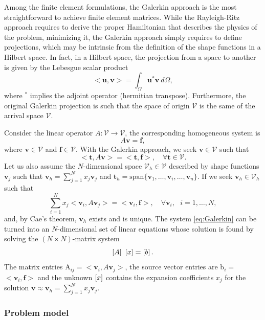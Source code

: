 Among the finite element formulations, the Galerkin approach is the most straightforward to achieve finite element matrices. While the Rayleigh-Ritz approach requires to derive the proper Hamiltonian that describes the physics of the problem,  minimizing it, the Galerkin approach simply requires to define projections, which may be intrinsic from the definition of the shape functions in a Hilbert space. In fact, in a Hilbert space, the projection from a space to another is given by the Lebesgue scalar product 
%
$$<\mathbf{u},\mathbf{v}> = \int_\Omega \mathbf{u}^* \mathbf{v} \ d\Omega,$$
%
\noindent where $^*$ implies the adjoint operator (hermitian transpose). Furthermore, the original Galerkin projection is such that the space of origin $\mathcal{V}$ is the same of the arrival space $\mathcal{V}$. 

Consider the linear operator $A : \mathcal{V} \longrightarrow \mathcal{V}$, the corresponding homogeneous system is
$$A \mathbf{v} = \mathbf{f},$$
\noindent where $\mathbf{v} \in \mathcal{V}$ and $\mathbf{f} \in \mathcal{V}$. With the Galerkin approach, we seek $\mathbf{v} \in \mathcal{V}$ such that
$$< \mathbf{t}, A \mathbf{v}> = <\mathbf{t},\mathbf{f}>, \quad \forall \mathbf{t} \in \mathcal{V}.$$
\noindent Let us also assume the $N$-dimensional space $\mathcal{V}_h\in \mathcal{V}$ described by shape functions $\mathbf{v}_j$ such that $\mathbf{v}_h = \sum_{j=1}^N x_j \mathbf{v}_j$ and $\mathbf{t}_h = \mathrm{span}\lbrace{\mathbf{v}_1, \ldots, \mathbf{v}_i, \ldots, \mathbf{v}_n}\rbrace$. If we seek $\mathbf{v}_h \in \mathcal{V}_h$ such that
\begin{equation}
\sum_{i=1}^N x_j < \mathbf{v}_i, A \mathbf{v}_j> = <\mathbf{v}_i,\mathbf{f}>, \quad \forall \mathbf{v}_i, \ \ \ i=1,\ldots,N,
\label{eq:Galerkin}
\end{equation}
%
\noindent and, by Cae's theorem, $\mathbf{v}_h$ exists and is unique. The system \eqref{eq:Galerkin} can be turned into an $N$-dimensional set of linear equations whose solution is found by solving the $(N \times N)$-matrix system
$$ \left[A\right] \ \left[{{x}}\right] = \left[{{b}}\right].$$
The matrix entries $\mathrm{A}_{ij} = < \mathbf{v}_i, A \mathbf{v}_j>$, the source vector entries are $\mathrm{b}_i =$ $<\mathbf{v}_i,\mathbf{f}>$ and the unknown $\left[{{x}}\right]$ contains the expansion coefficients $x_j$ for the solution $\mathbf{v} \approx \mathbf{v}_h = \sum_{j=1}^N x_j \mathbf{v}_j$.


\subsubsection{Problem model}

